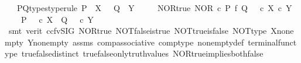\begin{isabellebody}
\ \ \ P{\isacharunderscore}{\kern0pt}Q{\isacharunderscore}{\kern0pt}types{\isacharbrackleft}{\kern0pt}type{\isacharunderscore}{\kern0pt}rule{\isacharbrackright}{\kern0pt}{\isacharcolon}{\kern0pt}\ {\isachardoublequoteopen}P\ {\isacharcolon}{\kern0pt}\ X\ {\isasymrightarrow}\ {\isasymOmega}{\isachardoublequoteclose}\ {\isachardoublequoteopen}Q\ {\isacharcolon}{\kern0pt}\ Y\ {\isasymrightarrow}\ {\isasymOmega}{\isachardoublequoteclose}\isanewline
\ \ \ NOR{\isacharunderscore}{\kern0pt}true{\isacharcolon}{\kern0pt}\ {\isachardoublequoteopen}NOR\ {\isasymcirc}\isactrlsub c\ {\isacharparenleft}{\kern0pt}P\ {\isasymtimes}\isactrlsub f\ Q{\isacharparenright}{\kern0pt}\ {\isacharequal}{\kern0pt}\ {\isasymt}\ {\isasymcirc}\isactrlsub c\ {\isasymbeta}\isactrlbsub X\ {\isasymtimes}\isactrlsub c\ Y\isactrlesub {\isachardoublequoteclose}\isanewline
\ \ \ {\isachardoublequoteopen}{\isasymnot}\ {\isacharparenleft}{\kern0pt}P\ {\isacharequal}{\kern0pt}\ {\isasymt}\ {\isasymcirc}\isactrlsub c\ {\isasymbeta}\isactrlbsub X\isactrlesub \ {\isasymor}\ Q\ {\isacharequal}{\kern0pt}\ {\isasymt}\ {\isasymcirc}\isactrlsub c\ {\isasymbeta}\isactrlbsub Y\isactrlesub {\isacharparenright}{\kern0pt}{\isachardoublequoteclose}\isanewline
%
\isadelimproof
\ \ %
\endisadelimproof
%
\isatagproof
{}\isamarkupfalse%
\ {\isacharparenleft}{\kern0pt}smt\ {\isacharparenleft}{\kern0pt}verit{\isacharcomma}{\kern0pt}\ ccfv{\isacharunderscore}{\kern0pt}SIG{\isacharparenright}{\kern0pt}\ NOR{\isacharunderscore}{\kern0pt}true\ NOT{\isacharunderscore}{\kern0pt}false{\isacharunderscore}{\kern0pt}is{\isacharunderscore}{\kern0pt}true\ NOT{\isacharunderscore}{\kern0pt}true{\isacharunderscore}{\kern0pt}is{\isacharunderscore}{\kern0pt}false\ NOT{\isacharunderscore}{\kern0pt}type\ X{\isacharunderscore}{\kern0pt}nonempty\ Y{\isacharunderscore}{\kern0pt}nonempty\ assms{\isacharparenleft}{\kern0pt}{}{\isacharcomma}{\kern0pt}{}{\isacharparenright}{\kern0pt}\ comp{\isacharunderscore}{\kern0pt}associative{}\ comp{\isacharunderscore}{\kern0pt}type\ nonempty{\isacharunderscore}{\kern0pt}def\ terminal{\isacharunderscore}{\kern0pt}func{\isacharunderscore}{\kern0pt}type\ true{\isacharunderscore}{\kern0pt}false{\isacharunderscore}{\kern0pt}distinct\ true{\isacharunderscore}{\kern0pt}false{\isacharunderscore}{\kern0pt}only{\isacharunderscore}{\kern0pt}truth{\isacharunderscore}{\kern0pt}values\ NOR{\isacharunderscore}{\kern0pt}true{\isacharunderscore}{\kern0pt}implies{\isacharunderscore}{\kern0pt}both{\isacharunderscore}{\kern0pt}false{\isacharparenright}{\kern0pt}%

\end{isabellebody}
